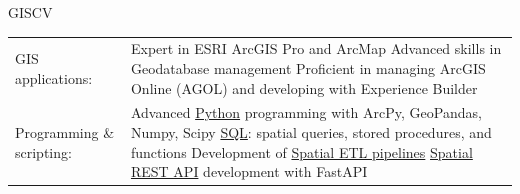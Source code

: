 \documentclass[letterpaper]{article}
\newenvironment{skillslist}
        {
            \hspace*{-0.07in}\begin{tabular}[t]{ l L{5.17in} }
        }{
            \end{tabular}
        }
\newcommand{\impt}[1]{\uline{#1}}
\begin{document}
    \begin{taggedblock}{GISCV}
        \begin{skillslist}
            GIS applications:&
                Expert in ESRI ArcGIS Pro and ArcMap \linebreak
                Advanced skills in Geodatabase management\linebreak
                Proficient in managing ArcGIS Online (AGOL) and developing with Experience Builder \linebreak
                \\
            Programming \& scripting:&
                Advanced \impt{Python} programming with ArcPy, GeoPandas, Numpy, Scipy\linebreak
                \impt{SQL}: spatial queries, stored procedures, and functions \linebreak
                Development of \impt{Spatial ETL pipelines} \linebreak
                \impt{Spatial REST API} development with FastAPI \linebreak
                \\

\end{skillslist}
\end{taggedblock}
\end{document}
